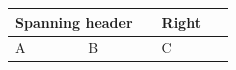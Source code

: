 \par\medskip
\begin{longtable}{|p{0.30\linewidth}|p{0.30\linewidth}|p{0.30\linewidth}|}
\hline
\multicolumn{2}{|p{0.60\linewidth}|}{Spanning header

} & Right

 \\
\hline
A

 & B

 & C

 \\
\hline
\end{longtable}
\medskip
